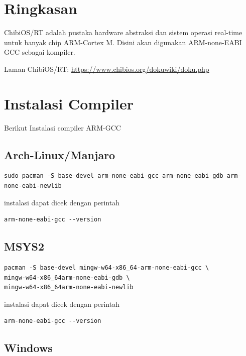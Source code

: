 \documentclass[12pt]{book}
\begin{document}
	\section{Ringkasan}
	
	ChibiOS/RT adalah pustaka hardware abstraksi dan sistem operasi real-time untuk banyak chip ARM-Cortex M.
	Disini akan digunakan ARM-none-EABI GCC sebagai kompiler.
	
	Laman ChibiOS/RT: \url{https://www.chibios.org/dokuwiki/doku.php}
	
	\section{Instalasi Compiler}
	
	Berikut Instalasi compiler ARM-GCC
	
	\subsection{Arch-Linux/Manjaro}

	\begin{verbatim}
sudo pacman -S base-devel arm-none-eabi-gcc arm-none-eabi-gdb arm-none-eabi-newlib
	\end{verbatim}
	
	instalasi dapat dicek dengan perintah
	\begin{verbatim}
arm-none-eabi-gcc --version
	\end{verbatim}
	
	\subsection{MSYS2}
	
	\begin{verbatim}
pacman -S base-devel mingw-w64-x86_64-arm-none-eabi-gcc \
mingw-w64-x86_64arm-none-eabi-gdb \
mingw-w64-x86_64arm-none-eabi-newlib
	\end{verbatim}
	
	instalasi dapat dicek dengan perintah
	\begin{verbatim}
arm-none-eabi-gcc --version
	\end{verbatim}
	
	\subsection{Windows}
	
\end{document}

